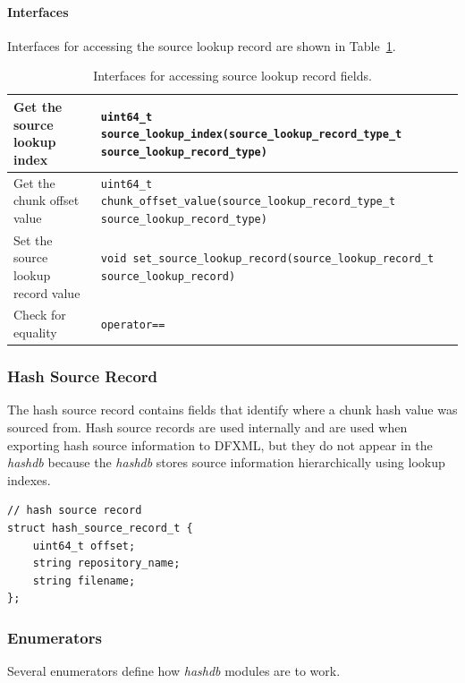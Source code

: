 \documentclass[12pt,twoside]{article}
\newcommand{\hdb}{\emph{hashdb}\xspace}
\begin{document}
\paragraph{Interfaces}
Interfaces for accessing the source lookup record
are shown in Table~\ref{source-lookup-interfaces}.
\begin{table}[h]
\center
\begin{tabular}{|p{2in}|p{4in}|}
\hline
Get the source lookup index & \texttt{uint64\_t source\_lookup\_index(source\_lookup\_record\_type\_t source\_lookup\_record\_type)} \\
\hline
Get the chunk offset value & \texttt{uint64\_t chunk\_offset\_value(source\_lookup\_record\_type\_t source\_lookup\_record\_type)} \\
\hline
Set the source lookup record value & \texttt{void set\_source\_lookup\_record(source\_lookup\_record\_t source\_lookup\_record)} \\
\hline
Check for equality & \texttt{operator==} \\
\hline
\end{tabular}
\caption{Interfaces for accessing source lookup record fields.\label{source-lookup-interfaces}}
\end{table}

\subsubsection{Hash Source Record}
The hash source record contains fields that identify where a chunk hash value was sourced from.
Hash source records are used internally and are used when exporting hash source information to DFXML,
but they do not appear in the \hdb
because the \hdb stores source information hierarchically using lookup indexes.
\begin{small}
\begin{verbatim}
// hash source record
struct hash_source_record_t {
    uint64_t offset;
    string repository_name;
    string filename;
};
\end{verbatim}
\end{small}

\subsubsection{Enumerators}
Several enumerators define how \hdb modules are to work.
\end{document}
